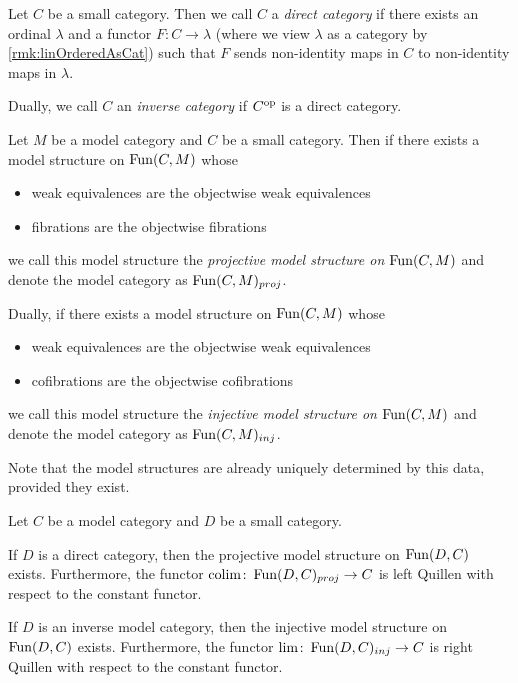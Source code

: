 \begin{definition}
    Let $C$ be a small category.
    Then we call $C$ a \emph{direct category} if there exists an ordinal $\lambda$ and a functor $F\colon C\to\lambda$ (where we view $\lambda$ as a category by \cref{rmk:linOrderedAsCat}) such that $F$ sends non-identity maps in $C$ to non-identity maps in $\lambda$.
    
    Dually, we call $C$ an \emph{inverse category} if $C^{\operatorname{op}}$ is a direct category.
\end{definition}
\begin{definition}
    Let $M$ be a model category and $C$ be a small category.
    Then if there exists a model structure on $\operatorname{Fun}(C,M)$ whose
    \begin{itemize}
        \item weak equivalences are the objectwise weak equivalences 
        \item fibrations are the objectwise fibrations
    \end{itemize}
    we call this model structure the \emph{projective model structure on $\operatorname{Fun}(C,M)$} and denote the model category as $\operatorname{Fun}(C,M)_{proj}$.

    Dually, if there exists a model structure on $\operatorname{Fun}(C,M)$ whose
    \begin{itemize}
        \item weak equivalences are the objectwise weak equivalences 
        \item cofibrations are the objectwise cofibrations
    \end{itemize}
    we call this model structure the \emph{injective model structure on $\operatorname{Fun}(C,M)$} and denote the model category as $\operatorname{Fun}(C,M)_{inj}$.

    Note that the model structures are already uniquely determined by this data, provided they exist.
\end{definition}
\begin{thm}\label{thm:exProjInjModelStr}
    Let $C$ be a model category and $D$ be a small category.

    If $D$ is a direct category, then the projective model structure on $\operatorname{Fun}(D,C)$ exists. 
    Furthermore, the functor $\operatorname*{colim}\colon\operatorname{Fun}(D,C)_{proj}\to C$ is left Quillen with respect to the constant functor.

    If $D$ is an inverse model category, then the injective model structure on $\operatorname{Fun}(D,C)$ exists.
    Furthermore, the functor $\lim\colon\operatorname{Fun}(D,C)_{inj}\to C$ is right Quillen with respect to the constant functor.
    \begin{reference}
        \cite[Theorem 5.1.3 and Corollary 5.1.6]{hovey2007model}
    \end{reference}
\end{thm}
